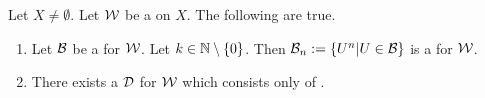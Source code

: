 \begin{prop}
    \label{prop:FundamentalSystemOfEntouragesFacts}
    Let $X \neq \emptyset$.
    Let $\mathcal{W}$
    be a \Uniformity on $X$. 
    The following are true. 
    \begin{enumerate}[label=(\roman*), ref={\ref{prop:FundamentalSystemOfEntouragesFacts}~\roman*}]
    \item \label{prop:FundamentalSystemOfEntouragesFacts:Powers}
    Let $\mathcal{B}$ be a \FundamentalSystemOfEntourages for $\mathcal{W}$. 
    Let $k \in \mathbb{N} \setminus \{0\}$. Then $\mathcal{B}_n:=\{U^n | U \in \mathcal{B}\}$ is a 
    \FundamentalSystemOfEntourages for $\mathcal{W}$. 
    \item There exists a \FundamentalSystemOfEntourages $\mathcal{D}$ for $\mathcal{W}$ which 
    consists only of \SymmetricRelation \Entourages. 
    \end{enumerate}
    
\end{prop}
